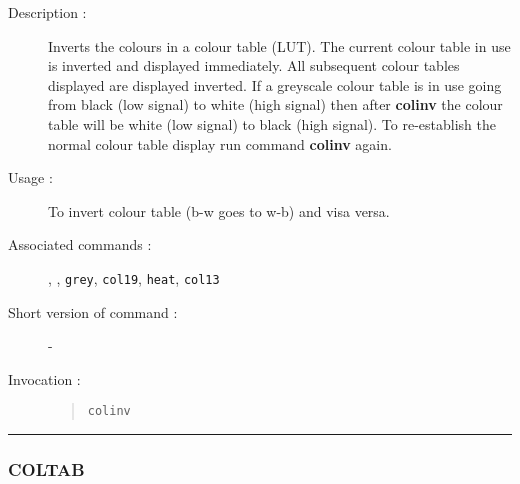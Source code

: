 \begin{description}

\item[Description :] Inverts the colours in a colour table (LUT).  The
current colour table in use is inverted and displayed immediately.  All
subsequent colour tables displayed are displayed inverted.  If a
greyscale colour table is in use going from black (low signal) to white
(high signal) then after {\bf colinv} the colour table will be white (low
signal) to black (high signal).  To re-establish the normal colour
table display run command {\bf colinv} again.

\item[Usage :] To invert colour table (b-w goes to w-b) and visa versa.
\item[Associated commands :] {\tt {}},
{\tt {}},
{\tt grey}, {\tt col19}, {\tt heat}, {\tt col13}
\item[Short version of command :] -
\item[Invocation :]

\begin{quote}{\tt  colinv }\end{quote}

\end{description}

\hrule
\subsubsection*{\label{COLTAB}COLTAB}

